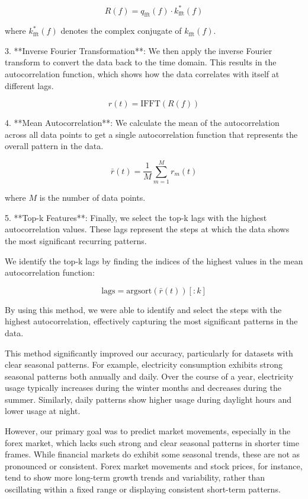     \[
    R(f) = q_{\text{fft}}(f) \cdot k_{\text{fft}}^*(f)
    \]

    where \( k_{\text{fft}}^*(f) \) denotes the complex conjugate of \( k_{\text{fft}}(f) \).

3. **Inverse Fourier Transformation**: We then apply the inverse Fourier transform to convert the data back to the time domain. This results in the autocorrelation function, which shows how the data correlates with itself at different lags.

    \[
    r(t) = \text{IFFT}(R(f))
    \]

4. **Mean Autocorrelation**: We calculate the mean of the autocorrelation across all data points to get a single autocorrelation function that represents the overall pattern in the data.

    \[
    \bar{r}(t) = \frac{1}{M} \sum_{m=1}^{M} r_m(t)
    \]

    where \( M \) is the number of data points.

5. **Top-k Features**: Finally, we select the top-k lags with the highest autocorrelation values. These lags represent the steps at which the data shows the most significant recurring patterns.

    We identify the top-k lags by finding the indices of the highest values in the mean autocorrelation function:

    \[
    \text{lags} = \text{argsort}(\bar{r}(t))[:k]
    \]

By using this method, we were able to identify and select the steps with the highest autocorrelation, effectively capturing the most significant patterns in the data.

This method significantly improved our accuracy, particularly for datasets with clear seasonal patterns. For example, electricity consumption exhibits strong seasonal patterns both annually and daily. Over the course of a year, electricity usage typically increases during the winter months and decreases during the summer. Similarly, daily patterns show higher usage during daylight hours and lower usage at night.

However, our primary goal was to predict market movements, especially in the forex market, which lacks such strong and clear seasonal patterns in shorter time frames. While financial markets do exhibit some seasonal trends, these are not as pronounced or consistent. Forex market movements and stock prices, for instance, tend to show more long-term growth trends and variability, rather than oscillating within a fixed range or displaying consistent short-term patterns.

